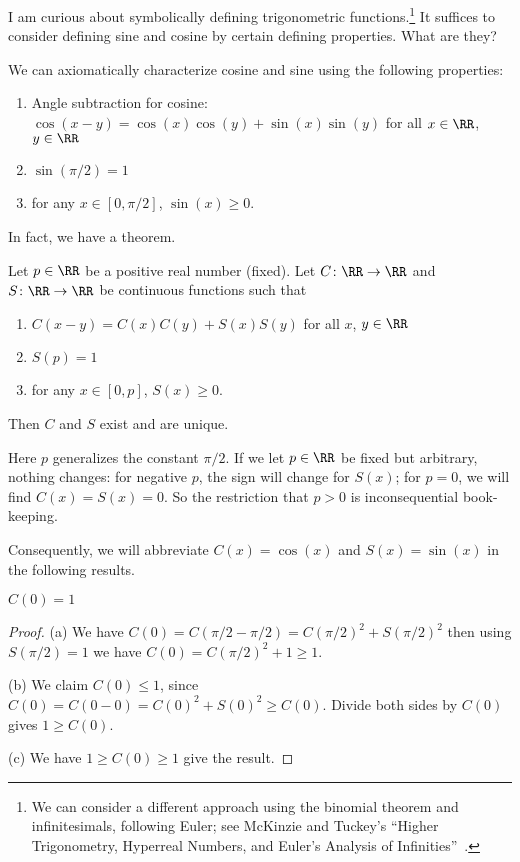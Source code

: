 I am curious about symbolically defining trigonometric
functions.\footnote{We can consider a different approach using the
binomial theorem and infinitesimals, following Euler; see McKinzie and
Tuckey's ``Higher Trigonometry, Hyperreal Numbers, and Euler’s Analysis of Infinities''~\cite{mckinzie}.} It
suffices to consider defining sine and cosine by certain defining
properties. What are they?

We can axiomatically characterize cosine and sine using the following
properties:
\begin{enumerate}
\item Angle subtraction for cosine: $\cos(x-y) = \cos(x)\cos(y) + \sin(x)\sin(y)$ for all $x\in\RR$, $y\in\RR$
\item $\sin(\pi/2)=1$
\item for any $x\in[0,\pi/2]$, $\sin(x)\geq0$.
\end{enumerate}
In fact, we have a theorem.

\begin{theorem}
Let $p\in\RR$ be a positive real number (fixed). Let $C\colon\RR\to\RR$
and $S\colon\RR\to\RR$ be continuous functions such that
\begin{enumerate}
\item $C(x-y) = C(x)C(y) + S(x)S(y)$ for all $x$, $y\in\RR$
\item $S(p)=1$
\item for any $x\in[0,p]$, $S(x)\geq0$.
\end{enumerate}
Then $C$ and $S$ exist and are unique.
\end{theorem}

Here $p$ generalizes the constant $\pi/2$. If we let $p\in\RR$ be fixed
but arbitrary, nothing changes: for negative $p$, the sign will change
for $S(x)$; for $p=0$, we will find $C(x)=S(x)=0$. So the restriction
that $p>0$ is inconsequential book-keeping.

Consequently, we will abbreviate $C(x)=\cos(x)$ and $S(x)=\sin(x)$ in
the following results.

\begin{proposition}
$C(0) = 1$
\end{proposition}
\begin{proof}
(a) We have $C(0) = C(\pi/2 - \pi/2) = C(\pi/2)^{2} + S(\pi/2)^{2}$
then using $S(\pi/2)=1$ we have $C(0) = C(\pi/2)^{2} + 1\geq 1$.

(b) We claim $C(0)\leq 1$, since $C(0) = C(0 - 0) = C(0)^{2} + S(0)^{2}\geq C(0)$.
Divide both sides by $C(0)$ gives $1\geq C(0)$.

(c) We have $1\geq C(0)\geq 1$ give the result.
\end{proof}

